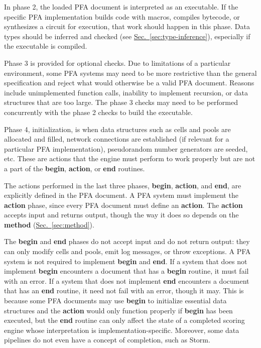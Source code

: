 \documentclass{article}
\newcommand{\PFAc}{\ttfamily\bfseries}
\theoremstyle{definition}
\begin{document}
In phase 2, the loaded PFA document is interpreted as an executable.  If the specific PFA implementation builds code with macros, compiles bytecode, or synthesizes a circuit for execution, that work should happen in this phase.  Data types should be inferred and checked (see \hyperlink{hsec:type-inference}{Sec.~\ref{sec:type-inference}}), especially if the executable is compiled.

Phase 3 is provided for optional checks.  Due to limitations of a particular environment, some PFA systems may need to be more restrictive than the general specification and reject what would otherwise be a valid PFA document.  Reasons include unimplemented function calls, inability to implement recursion, or data structures that are too large.  The phase 3 checks may need to be performed concurrently with the phase 2 checks to build the executable.

Phase 4, initialization, is when data structures such as cells and pools are allocated and filled, network connections are established (if relevant for a particular PFA implementation), pseudorandom number generators are seeded, etc.  These are actions that the engine must perform to work properly but are not a part of the {\PFAc begin}, {\PFAc action}, or {\PFAc end} routines.

The actions performed in the last three phases, {\PFAc begin}, {\PFAc action}, and {\PFAc end}, are explicitly defined in the PFA document.  A PFA system must implement the {\PFAc action} phase, since every PFA document must define an {\PFAc action}.  The {\PFAc action} accepts input and returns output, though the way it does so depends on the {\PFAc method} (\hyperlink{hsec:method}{Sec.~\ref{sec:method}}).

The {\PFAc begin} and {\PFAc end} phases do not accept input and do not return output: they can only modify cells and pools, emit log messages, or throw exceptions.  A PFA system is not required to implement {\PFAc begin} and {\PFAc end}.  If a system that does not implement {\PFAc begin} encounters a document that has a {\PFAc begin} routine, it must fail with an error.  If a system that does not implement {\PFAc end} encounters a document that has an {\PFAc end} routine, it need not fail with an error, though it may.  This is because some PFA documents may use {\PFAc begin} to initialize essential data structures and the {\PFAc action} would only function properly if {\PFAc begin} has been executed, but the {\PFAc end} routine can only affect the state of a completed scoring engine whose interpretation is implementation-specific.  Moreover, some data pipelines do not even have a concept of completion, such as Storm.
\end{document}
